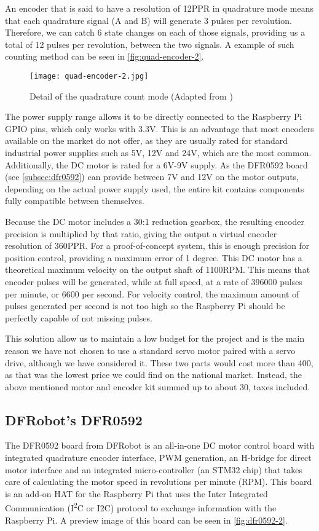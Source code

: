 An encoder that is said to have a resolution of 12PPR in quadrature mode means that each quadrature signal (A and B) will generate 3 pulses per revolution.
Therefore, we can catch 6 state changes on each of those signals, providing us a total of 12 pulses per revolution, between the two signals.
A example of such counting method can be seen in \autoref{fig:quad-encoder-2}.

\begin{figure}[htp]
	\centering
	\texttt{[image: quad-encoder-2.jpg]}
	\caption{Detail of the quadrature count mode (Adapted from \cite{technology:quad-encoder})}
	\label{fig:quad-encoder-2}
\end{figure}

The power supply range allows it to be directly connected to the Raspberry Pi GPIO pins, which only works with 3.3V.
This is an advantage that most encoders available on the market do not offer, as they are usually rated for standard industrial power supplies such as 5V, 12V and 24V, which are the most common.
Additionally, the DC motor is rated for a 6V-9V supply.
As the DFR0592 board (see \autoref{subsec:dfr0592}) can provide between 7V and 12V on the motor outputs, depending on the actual power supply used, the entire kit contains components fully compatible between themselves.

Because the DC motor includes a 30:1 reduction gearbox, the resulting encoder precision is multiplied by that ratio, giving the output a virtual encoder resolution of 360PPR.
For a proof-of-concept system, this is enough precision for position control, providing a maximum error of 1 degree.
This DC motor has a theoretical maximum velocity on the output shaft of 1100RPM.
This means that encoder pulses will be generated, while at full speed, at a rate of $396000$ pulses per minute, or $6600$ per second.
For velocity control, the maximum amount of pulses generated per second is not too high so the Raspberry Pi should be perfectly capable of not missing pulses.

This solution allow us to maintain a low budget for the project and is the main reason we have not chosen to use a standard servo motor paired with a servo drive, although we have considered it.
These two parts would cost more than 400\texteuro, as that was the lowest price we could find on the national market.
Instead, the above mentioned motor and encoder kit summed up to about 30\texteuro, taxes included.

\subsection{DFRobot's DFR0592} \label{subsec:dfr0592}
The DFR0592 board from DFRobot is an all-in-one DC motor control board with integrated quadrature encoder interface, PWM generation, an H-bridge for direct motor interface and an integrated micro-controller (an STM32 chip) that takes care of calculating the motor speed in revolutions per minute (RPM).
This board is an add-on HAT for the Raspberry Pi that uses the Inter Integrated Communication (I\textsuperscript{2}C or I2C) protocol to exchange information with the Raspberry Pi.
A preview image of this board can be seen in \autoref{fig:dfr0592-2}.

